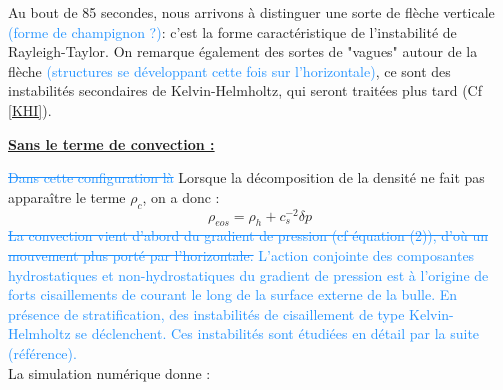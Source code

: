\documentclass{rapportECC}
\newcommand{\FAadd}[1]{\textcolor{DodgerBlue}{{#1}}}                     %
\newcommand{\FAdel}[1]{\textcolor{DodgerBlue}{\sout{#1}}}                %
\begin{document}
Au bout de 85 secondes, nous arrivons à distinguer une sorte de flèche verticale \FAadd{(forme de champignon ?)}: c'est la forme caractéristique de l'instabilité de Rayleigh-Taylor. On remarque également des sortes de "vagues" autour de la flèche \FAadd{(structures se développant cette fois sur l'horizontale)}, ce sont des instabilités secondaires de Kelvin-Helmholtz, qui seront traitées plus tard (Cf \ref{KHI}).


\vspace{1 cm}


\underline{\textbf{Sans le terme de convection :}} 
\label{sans rhoc}
\vspace{0.5 cm}

\FAdel{Dans cette configuration là} Lorsque la décomposition de la densité ne fait pas apparaître le terme $\rho_c$, on a donc :
\begin{equation}
    \rho_{eos} = \rho_h + c_s^{-2}\delta p
\end{equation}
\FAdel{La convection vient d'abord du gradient de pression (cf équation (2)), d'où un mouvement plus porté par l'horizontale.} \FAadd{ L'action conjointe des composantes hydrostatiques et non-hydrostatiques du gradient de pression est à l'origine de forts cisaillements de courant le long de la surface externe de la bulle. En présence de stratification, des instabilités de cisaillement de type Kelvin-Helmholtz se déclenchent. Ces instabilités sont étudiées en détail par la suite (référence).}
\\
La simulation numérique donne :
\end{document}
